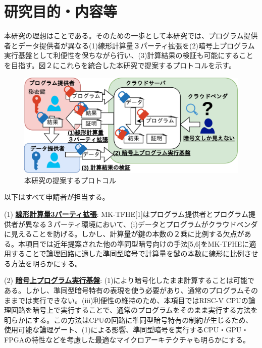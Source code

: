 
\section{研究目的・内容等}


本研究の理想はことである。そのための一歩として本研究では、プログラム提供者とデータ提供者が異なる(1)線形計算量３パーティ拡張を(2)暗号上プログラム実行基盤として利便性を保ちながら行い、(3)計算結果の検証も可能にすることを目指す。図２にこれらを統合した本研究で提案するプロトコルを示す。

\begin{figure}[h]
    \centering
    \includegraphics[width=0.8\linewidth]{figures/solution.drawio.png}
    \vspace*{-0.5cm}
    \caption{本研究の提案するプロトコル}
    \label{fig:solution}
\end{figure}


以下はすべて申請者が担当する。

\noindent(1) \underline{\textbf{線形計算量3パーティ拡張}}: MK-TFHE[1]はプログラム提供者とプログラム提供者が異なる３パーティ環境において、(i)データとプログラムがクラウドベンダに見えることを防げる。しかし、計算量が鍵の本数の２乗に比例する欠点がある。本項目では近年提案された他の準同型暗号向けの手法[5,6]をMK-TFHEに適用することで論理回路に適した準同型暗号で計算量を鍵の本数に線形に比例させる方法を明らかにする。

\noindent(2) \underline{\textbf{暗号上プログラム実行基盤}}: (1)により暗号化したまま計算することは可能である。しかし、準同型暗号特有の表現を使う必要があり、通常のプログラムそのままでは実行できない。(iii)利便性の維持のため、本項目ではRISC-V CPUの論理回路を暗号上で実行することで、通常のプログラムをそのまま実行する方法を明らかにする。この方法はCPUの回路に準同型暗号特有の制約が生じるため、使用可能な論理ゲート、(1)による影響、準同型暗号を実行するCPU・GPU・FPGAの特性などを考慮した最適なマイクロアーキテクチャも明らかにする。

